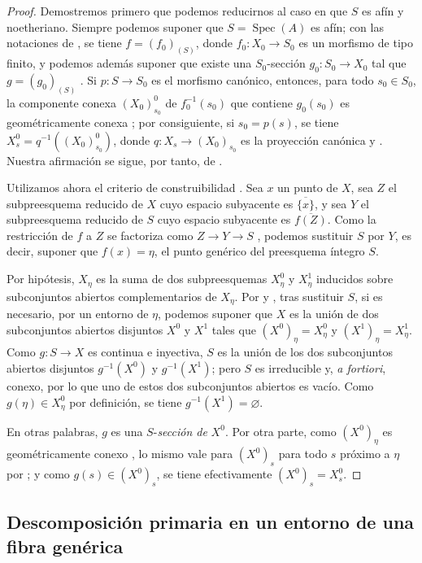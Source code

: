 \begin{proof}
Demostremos primero que podemos reducirnos al caso en que $S$ es afín y noetheriano. Siempre podemos suponer que $S=\operatorname{Spec}(A)$ es afín; con las notaciones de , se tiene $f=(f_0)_{(S)}$, donde $f_0:X_0\to S_0$ es un morfismo de tipo finito, y podemos además suponer que existe una $S_0$-sección $g_0:S_0\to X_0$ tal que $g=(g_0)_{(S)}$ . Si $p:S\to S_0$ es el morfismo canónico, entonces, para todo $s_0\in S_0$, la componente conexa $(X_0)^0_{s_0}$ de $f_0^{-1}(s_0)$ que contiene $g_0(s_0)$ es geométricamente conexa ; por consiguiente, si $s_0=p(s)$, se tiene $X_s^0=q^{-1}((X_0)^0_{s_0})$, donde $q:X_s\to (X_0)_{s_0}$ es la proyección canónica  y . Nuestra afirmación se sigue, por tanto, de .

Utilizamos ahora el criterio de construibilidad . Sea $x$ un punto de $X$, sea $Z$ el subpreesquema reducido de $X$ cuyo espacio subyacente es $\overline{\{x\}}$, y sea $Y$ el subpreesquema reducido de $S$ cuyo espacio subyacente es $\overline{f(Z)}$. Como la restricción de $f$ a $Z$ se factoriza como $Z\to Y\to S$ , podemos sustituir $S$ por $Y$, es decir, suponer que $f(x)=\eta$, el punto genérico del preesquema íntegro $S$.

Por hipótesis, $X_\eta$ es la suma de dos subpreesquemas $X_\eta^0$ y $X_\eta^1$ inducidos sobre subconjuntos abiertos complementarios de $X_\eta$. Por  y , tras sustituir $S$, si es necesario, por un entorno de $\eta$, podemos suponer que $X$ es la unión de dos subconjuntos abiertos disjuntos $X^0$ y $X^1$ tales que $(X^0)_\eta=X_\eta^0$ y $(X^1)_\eta=X_\eta^1$. Como $g:S\to X$ es continua e inyectiva, $S$ es la unión de los dos subconjuntos abiertos disjuntos $g^{-1}(X^0)$ y $g^{-1}(X^1)$; pero $S$ es irreducible y, \emph{a fortiori}, conexo, por lo que uno de estos dos subconjuntos abiertos es vacío. Como $g(\eta)\in X_\eta^0$ por definición, se tiene $g^{-1}(X^1)=\varnothing$.

En otras palabras, $g$ es una $S$-\emph{sección de} $X^0$. Por otra parte, como $(X^0)_\eta$ es geométricamente conexo , lo mismo vale para $(X^0)_s$ para todo $s$ próximo a $\eta$ por ; y como $g(s)\in (X^0)_s$, se tiene efectivamente $(X^0)_s=X_s^0$.
\end{proof}

\subsection{Descomposición primaria en un entorno de una fibra genérica}
\label{subsection:IV.9.8}
\label{IV.9.8}

